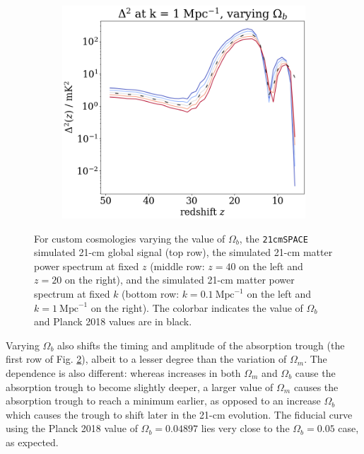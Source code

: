 \documentclass[floats,floatfix,showpacs,amssymb,prd,superscriptaddress,nofootinbib]{revtex4-2} %
\newcommand{\code}{\texttt}
\begin{document}
\begin{figure}[H]
\begin{subfigure}[b]{0.45\textwidth}
     \end{subfigure}
     \hfill
     \begin{subfigure}[b]{0.45\textwidth}
         \centering
         \includegraphics[width=\textwidth]{images/simulation_results/power_spectrum_fixed_k_1_Ob.png}
         \label{fig:power_spectrum_fixed_k_1_Ob}
     \end{subfigure}
        \caption{For custom cosmologies varying the value of $\Omega_b$, the \code{21cmSPACE} simulated 21-cm global signal (top row), the simulated 21-cm matter power spectrum at fixed $z$ (middle row: $z = 40$ on the left and $z = 20$ on the right), and the simulated 21-cm matter power spectrum at fixed $k$ (bottom row: $k = 0.1 ~\text{Mpc}^{-1}$ on the left and $k = 1 ~\text{Mpc}^{-1}$ on the right). The colorbar indicates the value of $\Omega_b$ and Planck 2018 values are in black.}
        \label{fig:simulation_results_Ob}
\end{figure}

Varying $\Omega_b$ also shifts the timing and amplitude of the absorption trough (the first row of Fig. \ref{fig:simulation_results_Ob}), albeit to a lesser degree than the variation of $\Omega_m$. The dependence is also different: whereas increases in both $\Omega_m$ and $\Omega_b$ cause the absorption trough to become slightly deeper, a larger value of $\Omega_m$ causes the absorption trough to reach a minimum earlier, as opposed to an increase $\Omega_b$ which causes the trough to shift later in the 21-cm evolution. The fiducial curve using the  Planck 2018 value of $\Omega_b = 0.04897$ lies very close to the $\Omega_b = 0.05$ case, as expected.
\end{document}

